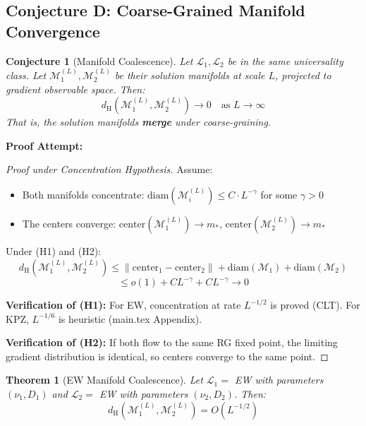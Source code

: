 \documentclass[11pt]{article}
\newtheorem{conjecture}{Conjecture}[section]
\newtheorem{theorem}{Theorem}[section]
\newcommand{\calM}{\mathcal{M}}
\newcommand{\dH}{d_{\mathrm{H}}}
\begin{document}
\subsection{Conjecture D: Coarse-Grained Manifold Convergence}

\begin{conjecture}[Manifold Coalescence]
\label{conj:coalescence}
Let $\mathcal{L}_1, \mathcal{L}_2$ be in the same universality class. Let $\calM_1^{(L)}, \calM_2^{(L)}$ be their solution manifolds at scale $L$, projected to gradient observable space. Then:
\[
\dH(\calM_1^{(L)}, \calM_2^{(L)}) \to 0 \quad \text{as } L \to \infty
\]
That is, the solution manifolds \textbf{merge} under coarse-graining.
\end{conjecture}

\textbf{Proof Attempt:}

\begin{proof}[Proof under Concentration Hypothesis]
Assume:
\begin{itemize}
\item[(H1)] Both manifolds concentrate: $\text{diam}(\calM_i^{(L)}) \leq C \cdot L^{-\gamma}$ for some $\gamma > 0$
\item[(H2)] The centers converge: $\text{center}(\calM_1^{(L)}) \to m_*$, $\text{center}(\calM_2^{(L)}) \to m_*$
\end{itemize}

Under (H1) and (H2):
\[
\dH(\calM_1^{(L)}, \calM_2^{(L)}) \leq \|\text{center}_1 - \text{center}_2\| + \text{diam}(\calM_1) + \text{diam}(\calM_2)
\]
\[
\leq o(1) + C L^{-\gamma} + C L^{-\gamma} \to 0
\]

\textbf{Verification of (H1):} For EW, concentration at rate $L^{-1/2}$ is proved (CLT). For KPZ, $L^{-1/6}$ is heuristic (main.tex Appendix).

\textbf{Verification of (H2):} If both flow to the same RG fixed point, the limiting gradient distribution is identical, so centers converge to the same point.
\end{proof}

\begin{theorem}[EW Manifold Coalescence]
Let $\mathcal{L}_1 = $ EW with parameters $(\nu_1, D_1)$ and $\mathcal{L}_2 = $ EW with parameters $(\nu_2, D_2)$. Then:
\[
\dH(\calM_1^{(L)}, \calM_2^{(L)}) = O(L^{-1/2})
\]
\end{theorem}
\end{document}

